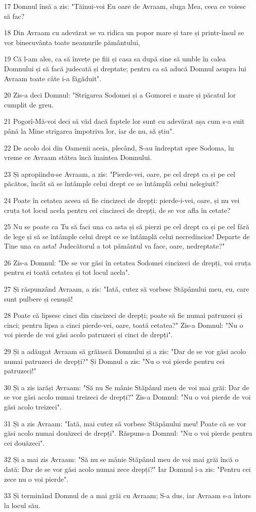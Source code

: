 \par 17 Domnul însă a zis: "Tăinui-voi Eu oare de Avraam, sluga Mea, ceea ce voiesc să fac?
\par 18 Din Avraam cu adevărat se va ridica un popor mare și tare și printr-însul se vor binecuvânta toate neamurile pământului,
\par 19 Că l-am ales, ca să învețe pe fiii și casa sa după sine să umble în calea Domnului și să facă judecată și dreptate; pentru ca să aducă Domnul asupra lui Avraam toate câte i-a făgăduit".
\par 20 Zis-a deci Domnul: "Strigarea Sodomei și a Gomorei e mare și păcatul lor cumplit de greu.
\par 21 Pogorî-Mă-voi deci să văd dacă faptele lor sunt cu adevărat așa cum s-a suit până la Mine strigarea împotriva lor, iar de nu, să știu".
\par 22 De acolo doi din Oamenii aceia, plecând, S-au îndreptat spre Sodoma, în vreme ce Avraam stătea încă înaintea Domnului.
\par 23 Și apropiindu-se Avraam, a zis: "Pierde-vei, oare, pe cel drept ca și pe cel păcătos, încât să se întâmple celui drept ce se întâmplă celui nelegiuit?
\par 24 Poate în cetatea aceea să fie cincizeci de drepți: pierde-i-vei, oare, și nu vei cruța tot locul acela pentru cei cincizeci de drepți, de se vor afla în cetate?
\par 25 Nu se poate ca Tu să faci una ca asta și să pierzi pe cel drept ca și pe cel fără de lege și să se întâmple celui drept ce se întâmplă celui necredincios! Departe de Tine una ca asta! Judecătorul a tot pământul va face, oare, nedreptate?"
\par 26 Zis-a Domnul: "De se vor găsi în cetatea Sodomei cincizeci de drepți, voi cruța pentru ei toată cetatea și tot locul acela".
\par 27 Și răspunzând Avraam, a zis: "Iată, cutez să vorbesc Stăpânului meu, eu, care sunt pulbere și cenușă!
\par 28 Poate că lipsesc cinci din cincizeci de drepți; poate să fie numai patruzeci și cinci; pentru lipsa a cinci pierde-vei, oare, toată cetatea?" Zis-a Domnul: "Nu o voi pierde de voi găsi acolo patruzeci și cinci de drepți".
\par 29 Și a adăugat Avraam să grăiască Domnului și a zis: "Dar de se vor găsi acolo numai patruzeci de drepți?" Și Domnul a zis: "Nu o voi pierde pentru cei patruzeci!"
\par 30 Și a zis iarăși Avraam: "Să nu Se mânie Stăpânul meu de voi mai grăi: Dar de se vor găsi acolo numai treizeci de drepți?" Zis-a Domnul: "Nu o voi pierde de voi găsi acolo treizeci".
\par 31 Și a zis Avraam: "Iată, mai cutez să vorbesc Stăpânului meu! Poate că se vor găsi acolo numai douăzeci de drepți". Răspuns-a Domnul: "Nu o voi pierde pentru cei douăzeci".
\par 32 Și a mai zis Avraam: "Să nu se mânie Stăpânul meu de voi mai grăi încă o dată: Dar de se vor găsi acolo numai zece drepți?" Iar Domnul i-a zis: "Pentru cei zece nu o voi pierde".
\par 33 Și terminând Domnul de a mai grăi cu Avraam; S-a dus, iar Avraam s-a întors la locul său.

